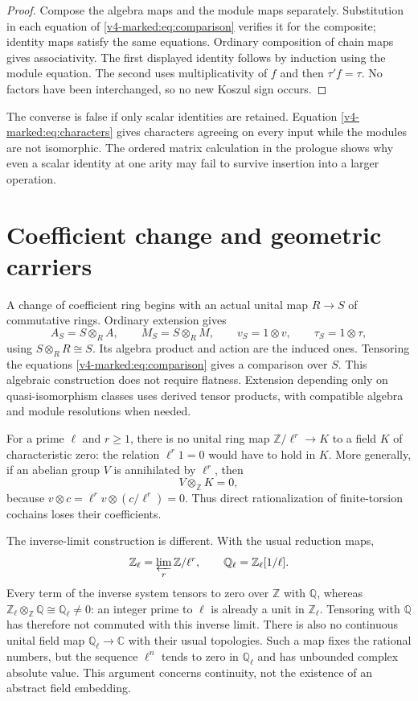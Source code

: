 \begin{proof}
Compose the algebra maps and the module maps separately. Substitution
in each equation of \eqref{v4-marked:eq:comparison} verifies it for
the composite; identity maps satisfy the same equations. Ordinary
composition of chain maps gives associativity. The first displayed
identity follows by induction using the module equation. The second
uses multiplicativity of \(f\) and then \(\tau'f=\tau\).
No factors have been interchanged, so no new Koszul sign occurs.
\end{proof}

The converse is false if only scalar identities are retained. Equation
\eqref{v4-marked:eq:characters} gives characters agreeing on every
input while the modules are not isomorphic. The ordered matrix calculation
in the prologue shows why even a scalar identity at one arity may fail
to survive insertion into a larger operation.

\section{Coefficient change and geometric carriers}
\label{v4-marked:sec:coefficients}

A change of coefficient ring begins with an actual unital map
\(R\to S\) of commutative rings. Ordinary extension gives
\[
 A_S=S\otimes_R A,\qquad M_S=S\otimes_R M,
 \qquad v_S=1\otimes v,\qquad \tau_S=1\otimes\tau,
\]
using \(S\otimes_R R\cong S\). Its algebra product and action
are the induced ones. Tensoring the equations
\eqref{v4-marked:eq:comparison} gives a comparison over \(S\).
This algebraic construction does not require flatness. Extension
depending only on quasi-isomorphism classes uses derived tensor
products, with compatible algebra and module resolutions when needed.

For a prime \(\ell\) and \(r\ge1\), there is no unital ring
map \(\mathbb Z/\ell^r\to K\) to a field \(K\) of
characteristic zero: the relation \(\ell^r1=0\) would have to
hold in \(K\). More generally, if an abelian group \(V\) is
annihilated by \(\ell^r\), then
\[
 V\otimes_{\mathbb Z}K=0,
\]
because
\(v\otimes c=\ell^rv\otimes(c/\ell^r)=0\).
Thus direct rationalization of finite-torsion cochains loses their
coefficients.

The inverse-limit construction is different. With the usual reduction
maps,
\[
 \mathbb Z_\ell=\varprojlim_r\mathbb Z/\ell^r,
 \qquad \mathbb Q_\ell=\mathbb Z_\ell[1/\ell].
\]
Every term of the inverse system tensors to zero over \(\mathbb Z\)
with \(\mathbb Q\), whereas
\(\mathbb Z_\ell\otimes_{\mathbb Z}\mathbb Q
\cong\mathbb Q_\ell\ne0\): an integer prime to \(\ell\)
is already a unit in \(\mathbb Z_\ell\). Tensoring with
\(\mathbb Q\) has therefore not commuted with this inverse
limit. There is also no continuous unital field map
\(\mathbb Q_\ell\to\mathbb C\) with their usual topologies.
Such a map fixes the rational numbers, but the sequence \(\ell^n\)
tends to zero in \(\mathbb Q_\ell\) and has unbounded complex
absolute value. This argument concerns continuity, not the existence
of an abstract field embedding.

